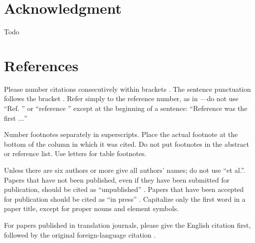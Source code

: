 \documentclass[conference]{IEEEtran}
\begin{document}
\section*{Acknowledgment}
Todo

\section*{References}

Please number citations consecutively within brackets \cite{b1}. The 
sentence punctuation follows the bracket \cite{b2}. Refer simply to the reference 
number, as in \cite{b3}---do not use ``Ref. \cite{b3}'' or ``reference \cite{b3}'' except at 
the beginning of a sentence: ``Reference \cite{b3} was the first $\ldots$''

Number footnotes separately in superscripts. Place the actual footnote at 
the bottom of the column in which it was cited. Do not put footnotes in the 
abstract or reference list. Use letters for table footnotes.

Unless there are six authors or more give all authors' names; do not use 
``et al.''. Papers that have not been published, even if they have been 
submitted for publication, should be cited as ``unpublished'' \cite{b4}. Papers 
that have been accepted for publication should be cited as ``in press'' \cite{b5}. 
Capitalize only the first word in a paper title, except for proper nouns and 
element symbols.

For papers published in translation journals, please give the English 
citation first, followed by the original foreign-language citation \cite{b6}.
\end{document}
